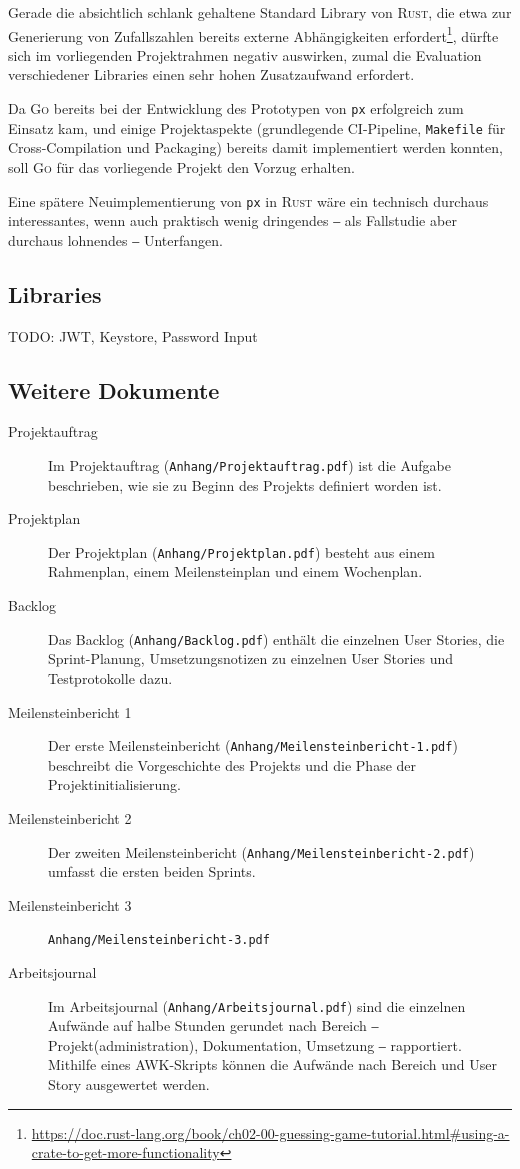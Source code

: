 Gerade die absichtlich schlank gehaltene Standard Library von \textsc{Rust}, die etwa zur Generierung von Zufallszahlen bereits externe Abhängigkeiten erfordert\footnote{\url{https://doc.rust-lang.org/book/ch02-00-guessing-game-tutorial.html\#using-a-crate-to-get-more-functionality}}, dürfte sich im vorliegenden Projektrahmen negativ auswirken, zumal die Evaluation verschiedener Libraries einen sehr hohen Zusatzaufwand erfordert.

Da \textsc{Go} bereits bei der Entwicklung des Prototypen von \texttt{px} erfolgreich zum Einsatz kam, und einige Projektaspekte (grundlegende CI-Pipeline, \texttt{Makefile} für Cross-Compilation und Packaging) bereits damit implementiert werden konnten, soll \textsc{Go} für das vorliegende Projekt den Vorzug erhalten.

Eine spätere Neuimplementierung von \texttt{px} in \textsc{Rust} wäre ein technisch durchaus interessantes, wenn auch praktisch wenig dringendes ‒ als Fallstudie aber durchaus lohnendes ‒ Unterfangen.

\subsection{Libraries}

TODO: JWT, Keystore, Password Input

\subsection{Weitere Dokumente}
\label{apx:WeitereDokumente}

\begin{description}
    \item[Projektauftrag] Im Projektauftrag (\texttt{Anhang/Projektauftrag.pdf}) ist die Aufgabe beschrieben, wie sie zu Beginn des Projekts definiert worden ist.
    \item[Projektplan] Der Projektplan (\texttt{Anhang/Projektplan.pdf}) besteht aus einem Rahmenplan, einem Meilensteinplan und einem Wochenplan.
    \item[Backlog] Das Backlog (\texttt{Anhang/Backlog.pdf}) enthält die einzelnen User Stories, die Sprint-Planung, Umsetzungsnotizen zu einzelnen User Stories und Testprotokolle dazu. 
    \item[Meilensteinbericht 1] Der erste Meilensteinbericht (\texttt{Anhang/Meilensteinbericht-1.pdf}) beschreibt die Vorgeschichte des Projekts und die Phase der Projektinitialisierung.
    \item[Meilensteinbericht 2] Der zweiten Meilensteinbericht (\texttt{Anhang/Meilensteinbericht-2.pdf}) umfasst die ersten beiden Sprints.
    \item[Meilensteinbericht 3] \texttt{Anhang/Meilensteinbericht-3.pdf}
    \item[Arbeitsjournal] Im Arbeitsjournal (\texttt{Anhang/Arbeitsjournal.pdf}) sind die einzelnen Aufwände auf halbe Stunden gerundet nach Bereich ‒ Projekt(administration), Dokumentation, Umsetzung ‒ rapportiert. Mithilfe eines AWK-Skripts können die Aufwände nach Bereich und User Story ausgewertet werden.
\end{description}
